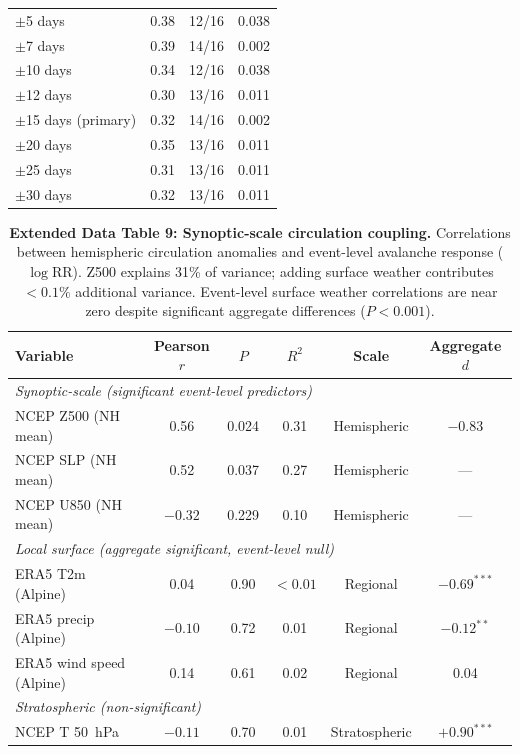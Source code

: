 \documentclass[11pt,letterpaper]{article}
\begin{document}
\begin{table}[!ht]
\begin{tabular}{lccc}
$\pm$5 days & 0.38 & 12/16 & 0.038 \\
$\pm$7 days & 0.39 & 14/16 & 0.002 \\
$\pm$10 days & 0.34 & 12/16 & 0.038 \\
$\pm$12 days & 0.30 & 13/16 & 0.011 \\
$\pm$15 days (primary) & 0.32 & 14/16 & 0.002 \\
$\pm$20 days & 0.35 & 13/16 & 0.011 \\
$\pm$25 days & 0.31 & 13/16 & 0.011 \\
$\pm$30 days & 0.32 & 13/16 & 0.011 \\
\bottomrule
\end{tabular}
\end{table}

\begin{table}[!ht]
\centering
\caption{\textbf{Extended Data Table 9: Synoptic-scale circulation coupling.}
Correlations between hemispheric circulation anomalies and event-level avalanche response ($\log\mathrm{RR}$). Z500 explains 31\% of variance; adding surface weather contributes $< 0.1\%$ additional variance. Event-level surface weather correlations are near zero despite significant aggregate differences ($P < 0.001$).}
\label{tab:synoptic}
\small
\begin{tabular}{lccccc}
\toprule
Variable & Pearson $r$ & $P$ & $R^2$ & Scale & Aggregate $d$ \\
\midrule
\multicolumn{6}{l}{\textit{Synoptic-scale (significant event-level predictors)}} \\
NCEP Z500 (NH mean) & 0.56 & 0.024 & 0.31 & Hemispheric & $-0.83$ \\
NCEP SLP (NH mean) & 0.52 & 0.037 & 0.27 & Hemispheric & --- \\
NCEP U850 (NH mean) & $-0.32$ & 0.229 & 0.10 & Hemispheric & --- \\
\midrule
\multicolumn{6}{l}{\textit{Local surface (aggregate significant, event-level null)}} \\
ERA5 T2m (Alpine) & 0.04 & 0.90 & $< 0.01$ & Regional & $-0.69^{***}$ \\
ERA5 precip (Alpine) & $-0.10$ & 0.72 & 0.01 & Regional & $-0.12^{**}$ \\
ERA5 wind speed (Alpine) & 0.14 & 0.61 & 0.02 & Regional & 0.04 \\
\midrule
\multicolumn{6}{l}{\textit{Stratospheric (non-significant)}} \\
NCEP T 50~hPa & $-0.11$ & 0.70 & 0.01 & Stratospheric & $+0.90^{***}$ \\

\end{tabular}
\end{table}
\end{document}
